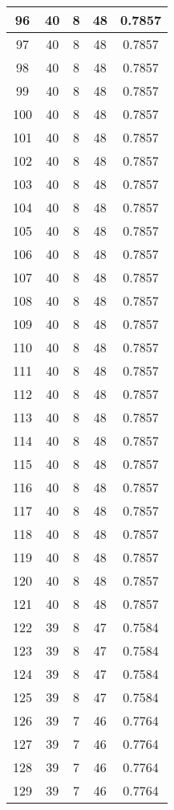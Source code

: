 \documentclass[letterpaper, 12pt]{article}
\begin{document}
\begin{longtable}{|c|c|c|c|c|}
\hline
96 & 40 & 8 & 48 & 0.7857 \\
\hline
97 & 40 & 8 & 48 & 0.7857 \\
\hline
98 & 40 & 8 & 48 & 0.7857 \\
\hline
99 & 40 & 8 & 48 & 0.7857 \\
\hline
100 & 40 & 8 & 48 & 0.7857 \\
\hline
101 & 40 & 8 & 48 & 0.7857 \\
\hline
102 & 40 & 8 & 48 & 0.7857 \\
\hline
103 & 40 & 8 & 48 & 0.7857 \\
\hline
104 & 40 & 8 & 48 & 0.7857 \\
\hline
105 & 40 & 8 & 48 & 0.7857 \\
\hline
106 & 40 & 8 & 48 & 0.7857 \\
\hline
107 & 40 & 8 & 48 & 0.7857 \\
\hline
108 & 40 & 8 & 48 & 0.7857 \\
\hline
109 & 40 & 8 & 48 & 0.7857 \\
\hline
110 & 40 & 8 & 48 & 0.7857 \\
\hline
111 & 40 & 8 & 48 & 0.7857 \\
\hline
112 & 40 & 8 & 48 & 0.7857 \\
\hline
113 & 40 & 8 & 48 & 0.7857 \\
\hline
114 & 40 & 8 & 48 & 0.7857 \\
\hline
115 & 40 & 8 & 48 & 0.7857 \\
\hline
116 & 40 & 8 & 48 & 0.7857 \\
\hline
117 & 40 & 8 & 48 & 0.7857 \\
\hline
118 & 40 & 8 & 48 & 0.7857 \\
\hline
119 & 40 & 8 & 48 & 0.7857 \\
\hline
120 & 40 & 8 & 48 & 0.7857 \\
\hline
121 & 40 & 8 & 48 & 0.7857 \\
\hline
122 & 39 & 8 & 47 & 0.7584 \\
\hline
123 & 39 & 8 & 47 & 0.7584 \\
\hline
124 & 39 & 8 & 47 & 0.7584 \\
\hline
125 & 39 & 8 & 47 & 0.7584 \\
\hline
126 & 39 & 7 & 46 & 0.7764 \\
\hline
127 & 39 & 7 & 46 & 0.7764 \\
\hline
128 & 39 & 7 & 46 & 0.7764 \\
\hline
129 & 39 & 7 & 46 & 0.7764 \\

\end{longtable}
\end{document}
